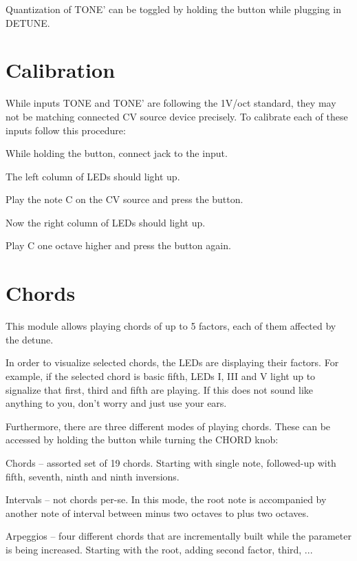 \documentclass[10pt,nofoldmark,nocombine]{leaflet} %
\newenvironment{packed_enumerate}{
\begin{enumerate}
  \setlength{\itemsep}{1pt}
  \setlength{\parskip}{0pt}
  \setlength{\parsep}{0pt}
}{\end{enumerate}}
\newenvironment{packed_enumerate_i}{
\begin{enumerate}[I]
  \setlength{\itemsep}{1pt}
  \setlength{\parskip}{0pt}
  \setlength{\parsep}{0pt}
}{\end{enumerate}}
\begin{document}
Quantization of TONE' can be toggled by holding the button while plugging in DETUNE.

\section{Calibration}

While inputs TONE and TONE' are following the 1V/oct standard, they may not be matching connected CV source device precisely. To calibrate each of these inputs follow this procedure:

\begin{packed_enumerate}
  \item While holding the button, connect jack to the input.
  \item The left column of LEDs should light up.
  \item Play the note C on the CV source and press the button.
  \item Now the right column of LEDs should light up.
  \item Play C one octave higher and press the button again.
\end{packed_enumerate}

\section{Chords}

This module allows playing chords of up to 5 factors, each of them affected by the detune.

In order to visualize selected chords, the LEDs are displaying their factors. For example, if the selected chord is basic fifth, LEDs I, III and V light up to signalize that first, third and fifth are playing. If this does not sound like anything to you, don't worry and just use your ears.

Furthermore, there are three different modes of playing chords. These can be accessed by holding the button while turning the CHORD knob:

\begin{packed_enumerate_i}
  \item Chords -- assorted set of 19 chords. Starting with single note, followed-up with fifth, seventh, ninth and ninth inversions.
  \item Intervals -- not chords per-se. In this mode, the root note is accompanied by another note of interval between minus two octaves to plus two octaves.
  \item Arpeggios -- four different chords that are incrementally built while the parameter is being increased. Starting with the root, adding second factor, third, ...
\end{packed_enumerate_i}
\end{document}

